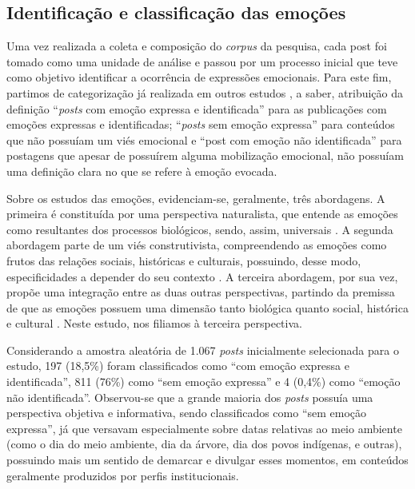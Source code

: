 \documentclass[portuguese]{textolivre}
\begin{document}
\subsection{Identificação e classificação das emoções}\label{sec-formato}
Uma vez realizada a coleta e composição do \textit{corpus} da pesquisa, cada post foi tomado como uma unidade de análise e passou por um processo inicial que teve como objetivo identificar a ocorrência de expressões emocionais. Para este fim, partimos de categorização já realizada em outros estudos \cite{fernandesdeoliveira2023vacina,fernandesdeoliveira2024kwai}, a saber, atribuição da definição “\textit{posts} com emoção expressa e identificada” para as publicações com emoções expressas e identificadas; “\textit{posts} sem emoção expressa” para conteúdos que não possuíam um viés emocional e “post com emoção não identificada” para postagens que apesar de possuírem alguma mobilização emocional, não possuíam uma definição clara no que se refere à emoção evocada.

Sobre os estudos das emoções, evidenciam-se, geralmente, três abordagens. A primeira é constituída por uma perspectiva naturalista, que entende as emoções como resultantes dos processos biológicos, sendo, assim, universais \cite{ekman1993facial,plutchik1962emotions}. A segunda abordagem parte de um viés construtivista, compreendendo as emoções como frutos das relações sociais, históricas e culturais, possuindo, desse modo, especificidades a depender do seu contexto \cite{barrett2017emotions}. A terceira abordagem, por sua vez, propõe uma integração entre as duas outras perspectivas, partindo da premissa de que as emoções possuem uma dimensão tanto biológica quanto social, histórica e cultural \cite{gu2019model,hofmann2018social}. Neste estudo, nos filiamos à terceira perspectiva.

Considerando a amostra aleatória de 1.067 \textit{posts} inicialmente selecionada para o estudo, 197 (18,5\%) foram classificados como “com emoção expressa e identificada”, 811 (76\%) como “sem emoção expressa” e 4 (0,4\%) como “emoção não identificada”. Observou-se que a grande maioria dos \textit{posts} possuía uma perspectiva objetiva e informativa, sendo classificados como “sem emoção expressa”, já que versavam especialmente sobre datas relativas ao meio ambiente (como o dia do meio ambiente, dia da árvore, dia dos povos indígenas, e outras), possuindo mais um sentido de demarcar e divulgar esses momentos, em conteúdos geralmente produzidos por perfis institucionais.
\end{document}
